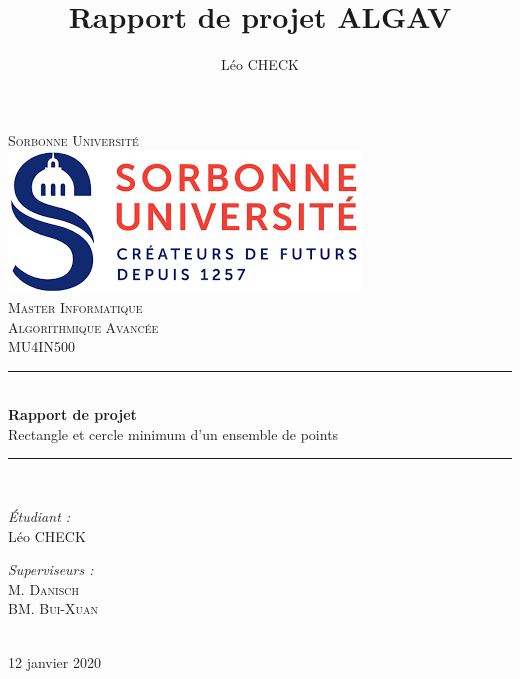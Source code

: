 \documentclass[a4paper, 12pt]{report}
\title{Rapport de projet ALGAV}
\author{Léo \textsc{CHECK}}
\begin{document}
\begin{titlepage}
\newcommand{\HRule}{\rule{\linewidth}{0.5mm}} 
\begin{center}
\textsc{\LARGE{}Sorbonne Université} \\[1cm]
\includegraphics[width=0.3\columnwidth]{su.png} \\[1cm] %
\textsc{\Large{}Master Informatique} \\[0.5cm] 
\textsc{\large{}Algorithmique Avancée \\ MU4IN500} \\[0.5cm]
\HRule \\[0.6cm]
{\huge\bfseries{}Rapport de projet} \\[0.25cm]
Rectangle et cercle minimum d'un ensemble de points \\ 
\HRule \\[1.5cm]

\begin{minipage}{0.45\linewidth}

\begin{flushleft}
\Large\textit{Étudiant :} \\
Léo \textsc{CHECK} %
\end{flushleft}
\end{minipage}
\hfill
\begin{minipage}{0.45\linewidth}
\begin{flushright}
\Large\textit{Superviseurs :} \\
M. \textsc{Danisch} \\ BM. \textsc{Bui-Xuan}  %
\end{flushright}
\end{minipage} \\[2cm]

{\large 12 janvier 2020} \\[2cm] 

\end{center}
\end{titlepage}
\end{document}
